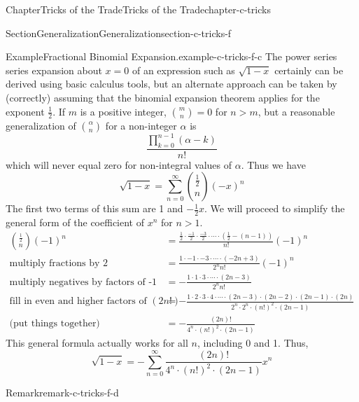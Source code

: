 \documentclass[oneside,10pt,]{book}
\numberwithin{equation}{section}
\newcommand{\gt}{>}
\begin{document}
\begin{chapterptx}{Chapter}{Tricks of the Trade}{}{Tricks of the Trade}{}{}{chapter-c-tricks}
\begin{sectionptx}{Section}{Generalization}{}{Generalization}{}{}{section-c-tricks-f}
\begin{example}{Example}{Fractional Binomial Expansion.}{example-c-tricks-f-c}%
%
The power series series expansion about \(x=0\) of an expression such as \(\sqrt{1-x}\) certainly can be derived using basic calculus tools, but an alternate approach can be taken by (correctly) assuming that the binomial expansion theorem applies for the exponent \(\frac{1}{2}\).  If \(m\) is a positive integer, \(\binom{m}{n} =0\) for \(n \gt m\), but a reasonable generalization of \(\binom{\alpha}{n}\) for a non-integer \(\alpha\) is%
\begin{equation*}
\frac{\prod_{k=0}^{n-1} (\alpha-k)}{n!}
\end{equation*}
which will never equal zero for non-integral values of \(\alpha\).  Thus we have%
\begin{equation*}
\sqrt{1-x} = \sum_{n=0}^{\infty} \binom{\frac{1}{2}}{n} (-x)^n
\end{equation*}
The first two terms of this sum are 1 and \(-\frac{1}{2} x\). We will proceed to simplify the general form of the coefficient of \(x^n\) for \(n \gt 1\).%
\begin{equation*}
\begin{split}
\binom{\frac{1}{2}}{n} (-1)^n
&=  \frac{\frac{1}{2} \cdot\frac{-1}{2}\cdot\frac{-3}{2}\cdot \cdots \cdot(\frac{1}{2}-(n-1)) }{n!} (-1)^n\\
\textrm{multiply fractions by 2 }	&=  \frac{1 \cdot -1 \cdot -3 \cdot \cdots \cdot (-2n+3)}{2^{n} n!} (-1)^n\\
\textrm{multiply negatives by factors of -1}	&= - \frac{1 \cdot 1 \cdot 3 \cdot \cdots \cdot (2n-3)}{2^{n} n!}  \\
\textrm{fill in even and higher factors of }(2n!)	&= - \frac{ 1 \cdot 2 \cdot 3\cdot 4 \cdot \cdots \cdot (2n-3)\cdot (2n-2)\cdot (2n-1)\cdot (2n)}{2^n\cdot 2^n\cdot (n!)^2 \cdot (2n-1)}  \\
\textrm{(put things together)}	&= - \frac{(2n)!}{4^n \cdot(n!)^2\cdot (2n-1)} 
\end{split}
\end{equation*}
This general formula actually works for all \(n\), including 0 and 1.   Thus,%
\begin{equation*}
\sqrt{1-x}  = - \sum_{n=0}^{\infty} \frac{(2n)!}{4^n \cdot(n!)^2\cdot (2n-1)}  x^n  
\end{equation*}
%
\end{example}
\begin{remark}{Remark}{}{remark-c-tricks-f-d}%

\end{remark}
\end{sectionptx}
\end{chapterptx}
\end{document}
